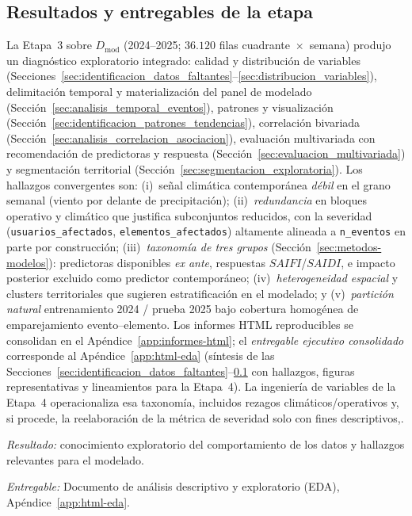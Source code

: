 \subsection{Resultados y entregables de la etapa}
\label{sec:resultados_eda}
    La Etapa~3 sobre $D_{\mathrm{mod}}$ (2024--2025; $36{.}120$ filas cuadrante~$\times$~semana) produjo un diagnóstico exploratorio integrado: calidad y distribución de variables (Secciones~\ref{sec:identificacion_datos_faltantes}--\ref{sec:distribucion_variables}), delimitación temporal y materialización del panel de modelado (Sección~\ref{sec:analisis_temporal_eventos}), patrones y visualización (Sección~\ref{sec:identificacion_patrones_tendencias}), correlación bivariada (Sección~\ref{sec:analisis_correlacion_asociacion}), evaluación multivariada con recomendación de predictoras y respuesta (Sección~\ref{sec:evaluacion_multivariada}) y segmentación territorial (Sección~\ref{sec:segmentacion_exploratoria}). Los hallazgos convergentes son: (i)~señal climática contemporánea \textit{débil} en el grano semanal (viento por delante de precipitación); (ii)~\textit{redundancia} en bloques operativo y climático que justifica subconjuntos reducidos, con la severidad (\texttt{usuarios\_afectados}, \texttt{elementos\_afectados}) altamente alineada a \texttt{n\_eventos} en parte por construcción; (iii)~\textit{taxonomía de tres grupos} (Sección~\ref{sec:metodos-modelos}): predictoras disponibles \emph{ex ante}, respuestas $SAIFI$/$SAIDI$, e impacto posterior excluido como predictor contemporáneo; (iv)~\textit{heterogeneidad espacial} y clusters territoriales que sugieren estratificación en el modelado; y (v)~\textit{partición natural} entrenamiento 2024 / prueba 2025 bajo cobertura homogénea de emparejamiento evento--elemento. Los informes HTML reproducibles se consolidan en el Apéndice~\ref{app:informes-html}; el \textit{entregable ejecutivo consolidado} corresponde al Apéndice~\ref{app:html-eda} (síntesis de las Secciones~\ref{sec:identificacion_datos_faltantes}--\ref{sec:resultados_eda} con hallazgos, figuras representativas y lineamientos para la Etapa~4). La ingeniería de variables de la Etapa~4 operacionaliza esa taxonomía, incluidos rezagos climáticos/operativos y, si procede, la reelaboración de la métrica de severidad solo con fines descriptivos,.
    
    \textit{Resultado:} conocimiento exploratorio del comportamiento de los datos y hallazgos relevantes para el modelado.
    
    \textit{Entregable:} Documento de análisis descriptivo y exploratorio (EDA), Apéndice~\ref{app:html-eda}.
    

